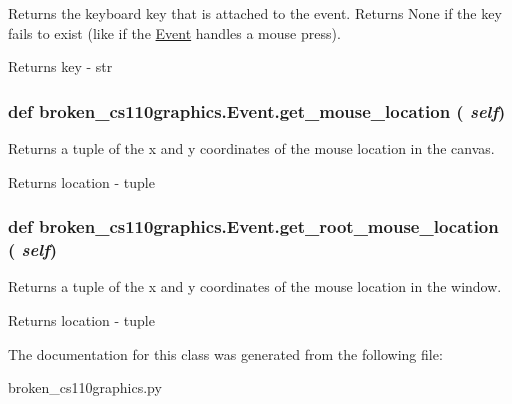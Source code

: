 Returns the keyboard key that is attached to the event. Returns None if the key fails to exist (like if the \hyperlink{classbroken__cs110graphics_1_1Event}{Event} handles a mouse press). \begin{DoxyReturn}{Returns}
key -\/ str 
\end{DoxyReturn}
\hypertarget{classbroken__cs110graphics_1_1Event_a7db9cf2e411a07713a6327bd27c73658}{
\subsubsection[{get\_\-mouse\_\-location}]{\setlength{\rightskip}{0pt plus 5cm}def broken\_\-cs110graphics.Event.get\_\-mouse\_\-location ( {\em self})}}
\label{classbroken__cs110graphics_1_1Event_a7db9cf2e411a07713a6327bd27c73658}


Returns a tuple of the x and y coordinates of the mouse location in the canvas. \begin{DoxyReturn}{Returns}
location -\/ tuple 
\end{DoxyReturn}
\hypertarget{classbroken__cs110graphics_1_1Event_ada40290d45fbb9d296f695e5d9760b65}{
\subsubsection[{get\_\-root\_\-mouse\_\-location}]{\setlength{\rightskip}{0pt plus 5cm}def broken\_\-cs110graphics.Event.get\_\-root\_\-mouse\_\-location ( {\em self})}}
\label{classbroken__cs110graphics_1_1Event_ada40290d45fbb9d296f695e5d9760b65}


Returns a tuple of the x and y coordinates of the mouse location in the window. \begin{DoxyReturn}{Returns}
location -\/ tuple 
\end{DoxyReturn}


The documentation for this class was generated from the following file:\begin{DoxyCompactItemize}
\item 
broken\_\-cs110graphics.py\end{DoxyCompactItemize}
